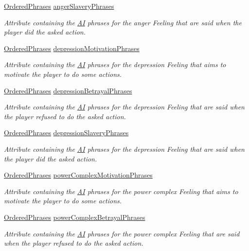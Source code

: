 \begin{DoxyCompactItemize}
\hyperlink{a00016}{Ordered\-Phrases} \hyperlink{a00018_a1c50856055990e9a1c22fd2b364bdf85}{anger\-Slavery\-Phrases}
\begin{DoxyCompactList}\small\item\em Attribute containing the \hyperlink{a00001}{A\-I} phrases for the anger Feeling that are said when the player did the asked action. \end{DoxyCompactList}\item 
\hyperlink{a00016}{Ordered\-Phrases} \hyperlink{a00018_a7134cba12ee037a9737e6e5dcdc02ba8}{depression\-Motivation\-Phrases}
\begin{DoxyCompactList}\small\item\em Attribute containing the \hyperlink{a00001}{A\-I} phrases for the depression Feeling that aims to motivate the player to do some actions. \end{DoxyCompactList}\item 
\hyperlink{a00016}{Ordered\-Phrases} \hyperlink{a00018_a1ab28780f3cb894c496ebd26185493aa}{depression\-Betrayal\-Phrases}
\begin{DoxyCompactList}\small\item\em Attribute containing the \hyperlink{a00001}{A\-I} phrases for the depression Feeling that are said when the player refused to do the asked action. \end{DoxyCompactList}\item 
\hyperlink{a00016}{Ordered\-Phrases} \hyperlink{a00018_ab8f4fdd33f163351fb6ff578cb950a44}{depression\-Slavery\-Phrases}
\begin{DoxyCompactList}\small\item\em Attribute containing the \hyperlink{a00001}{A\-I} phrases for the depression Feeling that are said when the player did the asked action. \end{DoxyCompactList}\item 
\hyperlink{a00016}{Ordered\-Phrases} \hyperlink{a00018_ad566ad78166872e95e920833f4f36e90}{power\-Complex\-Motivation\-Phrases}
\begin{DoxyCompactList}\small\item\em Attribute containing the \hyperlink{a00001}{A\-I} phrases for the power complex Feeling that aims to motivate the player to do some actions. \end{DoxyCompactList}\item 
\hyperlink{a00016}{Ordered\-Phrases} \hyperlink{a00018_a77e67b74525c919463d3c9b830fe895d}{power\-Complex\-Betrayal\-Phrases}
\begin{DoxyCompactList}\small\item\em Attribute containing the \hyperlink{a00001}{A\-I} phrases for the power complex Feeling that are said when the player refused to do the asked action. \end{DoxyCompactList}\item 

\end{DoxyCompactItemize}
